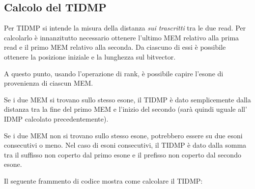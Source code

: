 

\subsection{Calcolo del TIDMP}
Per TIDMP si intende la misura della distanza \textit{sui trascritti} tra le due read. Per calcolarlo è innanzitutto necessario ottenere l'ultimo MEM relativo alla prima read e il primo MEM relativo alla seconda. Da ciascuno di essi è possibile ottenere la posizione iniziale e la lunghezza sul bitvector. 

A questo punto, usando l'operazione di rank, è possibile capire l'esone di provenienza di ciascun MEM.

Se i due MEM si trovano sullo stesso esone, il TIDMP è dato semplicemente dalla distanza tra la fine del primo MEM e l'inizio del secondo (sarà quindi uguale all' IDMP calcolato precedentemente).

Se i due MEM non si trovano sullo stesso esone, potrebbero essere su due esoni consecutivi o meno. Nel caso di esoni consecutivi, il TIDMP è dato dalla somma tra il suffisso non coperto dal primo esone e il prefisso non coperto dal secondo esone.

Il seguente frammento di codice mostra come calcolare il TIDMP:

